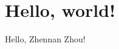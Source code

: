 \documentclass[english, nochinese]{pkupaper}
\title{\titlemark}
\author{\authoring}
\begin{document}
\maketitle

\section{Hello, world!}

Hello, Zhennan Zhou!
\end{document}
